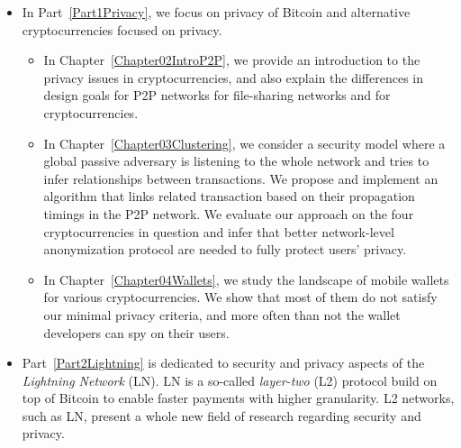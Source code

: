 \begin{itemize}
	\item 
	In Part~\ref{Part1Privacy}, we focus on privacy of Bitcoin and alternative cryptocurrencies focused on privacy.
	\begin{itemize}
		\item
	In Chapter~\ref{Chapter02IntroP2P}, we provide an introduction to the privacy issues in cryptocurrencies, and also explain the differences in design goals for P2P networks for file-sharing networks and for cryptocurrencies.
		\item
	In Chapter~\ref{Chapter03Clustering}, we consider a security model where a global passive adversary is listening to the whole network and tries to infer relationships between transactions.
	We propose and implement an algorithm that links related transaction based on their propagation timings in the P2P network.
	We evaluate our approach on the four cryptocurrencies in question and infer that better network-level anonymization protocol are needed to fully protect users' privacy.
		\item
	In Chapter~\ref{Chapter04Wallets}, we study the landscape of mobile wallets for various cryptocurrencies.
	We show that most of them do not satisfy our minimal privacy criteria, and more often than not the wallet developers can spy on their users.
	\end{itemize}
	\item
	Part~\ref{Part2Lightning} is dedicated to security and privacy aspects of the \textit{Lightning Network} (LN).
	LN is a so-called \textit{layer-two} (L2) protocol build on top of Bitcoin to enable faster payments with higher granularity.
	L2 networks, such as LN, present a whole new field of research regarding security and privacy.
	

\end{itemize}
